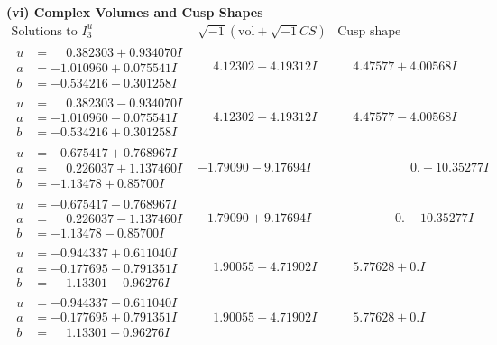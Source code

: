 \documentclass[1p]{elsarticle_modified}
\theoremstyle{definition}
\newcommand{\I}{\sqrt{-1}}
\begin{document}
\newpage\flushleft \textbf{(vi) Complex Volumes and Cusp Shapes}
$$\begin{array}{c|c|c}  
\text{Solutions to }I^u_{3}& \I (\text{vol} + \sqrt{-1}CS) & \text{Cusp shape}\\
 \hline 
\begin{aligned}
u &= \phantom{-}0.382303 + 0.934070 I \\
a &= -1.010960 + 0.075541 I \\
b &= -0.534216 - 0.301258 I\end{aligned}
 & \phantom{-}4.12302 - 4.19312 I & \phantom{-}4.47577 + 4.00568 I \\ \hline\begin{aligned}
u &= \phantom{-}0.382303 - 0.934070 I \\
a &= -1.010960 - 0.075541 I \\
b &= -0.534216 + 0.301258 I\end{aligned}
 & \phantom{-}4.12302 + 4.19312 I & \phantom{-}4.47577 - 4.00568 I \\ \hline\begin{aligned}
u &= -0.675417 + 0.768967 I \\
a &= \phantom{-}0.226037 + 1.137460 I \\
b &= -1.13478 + 0.85700 I\end{aligned}
 & -1.79090 - 9.17694 I & \phantom{-0.000000 -}0. + 10.35277 I \\ \hline\begin{aligned}
u &= -0.675417 - 0.768967 I \\
a &= \phantom{-}0.226037 - 1.137460 I \\
b &= -1.13478 - 0.85700 I\end{aligned}
 & -1.79090 + 9.17694 I & \phantom{-0.000000 } 0. - 10.35277 I \\ \hline\begin{aligned}
u &= -0.944337 + 0.611040 I \\
a &= -0.177695 - 0.791351 I \\
b &= \phantom{-}1.13301 - 0.96276 I\end{aligned}
 & \phantom{-}1.90055 - 4.71902 I & \phantom{-}5.77628 + 0. I\phantom{ +0.000000I} \\ \hline\begin{aligned}
u &= -0.944337 - 0.611040 I \\
a &= -0.177695 + 0.791351 I \\
b &= \phantom{-}1.13301 + 0.96276 I\end{aligned}
 & \phantom{-}1.90055 + 4.71902 I & \phantom{-}5.77628 + 0. I\phantom{ +0.000000I} \\ \hline\begin{aligned}

\end{aligned}
\end{array}$$
\end{document}
